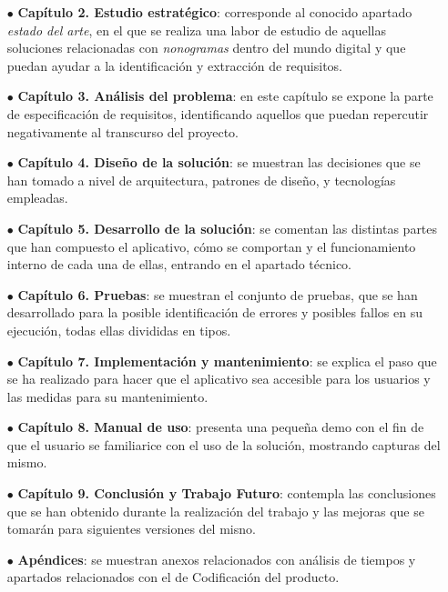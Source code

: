 \begin{itemize}
   \item[$\bullet$] \textbf{Capítulo 2. Estudio estratégico}: corresponde al conocido apartado \textit{estado del arte}, en el que se realiza una labor 
   de estudio de aquellas soluciones relacionadas con \textit{nonogramas} dentro del mundo digital y que puedan ayudar a la identificación y extracción de requisitos.
   \item[$\bullet$] \textbf{Capítulo 3. Análisis del problema}: en este capítulo se expone la parte de especificación de requisitos,
    identificando aquellos que puedan repercutir negativamente al transcurso del proyecto.
   \item[$\bullet$] \textbf{Capítulo 4. Diseño de la solución}: se muestran las decisiones que se han tomado a nivel de arquitectura, patrones de diseño, 
   y tecnologías empleadas.
   \item[$\bullet$] \textbf{Capítulo 5. Desarrollo de la solución}: se comentan las distintas partes que han compuesto el aplicativo, cómo se comportan y 
   el funcionamiento interno de cada una de ellas, entrando en el apartado técnico.
   \item[$\bullet$] \textbf{Capítulo 6. Pruebas}: se muestran el conjunto de pruebas, que se han desarrollado para la posible identificación de 
   errores y posibles fallos en su ejecución, todas ellas divididas en tipos. 
   \item[$\bullet$] \textbf{Capítulo 7. Implementación y mantenimiento}: se explica el paso que se ha realizado para hacer que el aplicativo sea accesible
   para los usuarios y las medidas para su mantenimiento. 
   \item[$\bullet$] \textbf{Capítulo 8. Manual de uso}: presenta una pequeña demo con el fin de que el usuario se familiarice con el uso de
   la solución, mostrando capturas del mismo.
   \item[$\bullet$] \textbf{Capítulo 9. Conclusión y Trabajo Futuro}: contempla las conclusiones que se han obtenido durante la realización del trabajo y
   las mejoras que se tomarán para siguientes versiones del misno.
   \item[$\bullet$] \textbf{Apéndices}: se muestran anexos relacionados con análisis de tiempos y apartados relacionados con el de Codificación del
   producto.
\end{itemize}